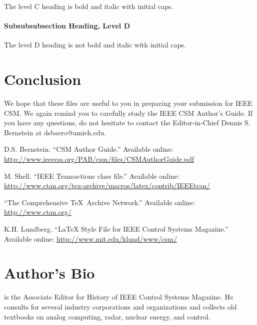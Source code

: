 \documentclass[letterpaper,12pt,peerreviewca,draftcls]{IEEEtran}
\begin{document}
The level C heading is bold and italic with initial caps.


\paragraph{Subsubsubsection Heading, Level D}


The level D heading is not bold and italic with initial caps.






\section{Conclusion}


We hope that these files are useful to you in preparing your submission
for IEEE CSM.  We again remind you to carefully study the IEEE CSM
Author's Guide.  If you have any questions, do not hesitate to contact
the Editor-in-Chief Dennis S. Bernstein at dsbaero@umich.edu.



\newpage

\clearpage

\begin{thebibliography}{1}

D.S. Bernstein. ``CSM Author Guide.'' Available online:
\url{http://www.ieeecss.org/PAB/csm/files/CSMAuthorGuide.pdf}


M. Shell.  ``IEEE Transactions class file.''  Available online:
\url{http://www.ctan.org/tex-archive/macros/latex/contrib/IEEEtran/}


``The Comprehensive \TeX\ Archive Network.''
Available online: \url{http://www.ctan.org/}


K.H. Lundberg.  ``LaTeX Style File for IEEE Control Systems Magazine.''
Available online: \url{http://www.mit.edu/klund/www/csm/}

\end{thebibliography}


\section{Author's Bio}

 is the Associate Editor for History of
IEEE Control Systems Magazine.  He consults for several industry
corporations and organizations and collects old textbooks on analog
computing, radar, nuclear energy, and control.
\end{document}
